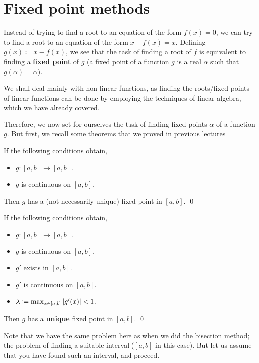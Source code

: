 
\section{Fixed point methods}

Instead of trying to find a root to an equation of the form $f(x) = 0$, we can try to find a root to an equation of the form $x - f(x) = x$. Defining $g(x) \coloneqq x - f(x)$, we see that the task of finding a root of $f$ is equivalent to finding a \textbf{fixed point} of $g$ (a fixed point of a function $g$ is a real $\alpha$ such that $g(\alpha) = \alpha$).

We shall deal mainly with non-linear functions, as finding the roots/fixed points of linear functions can be done by employing the techniques of linear algebra, which we have already covered.

Therefore, we now set for ourselves the task of finding fixed points $\alpha$ of a function $g$. But first, we recall some theorems that we proved in previous lectures

\begin{thm}
	\label{mar4:thm:efp}
	\hfill

	If the following conditions obtain,
	\begin{itemize}
		\item
		      $g \colon [a, b] \to [a, b]$.

		\item
		      $g$ is continuous on $[a, b]$.

	\end{itemize}
	Then $g$ has a (not necessarily unique) fixed point in $[a, b]$.
	\hfill\qed
\end{thm}

\begin{thm}
	\label{mar4:thm:ufp}
	\hfill

	If the following conditions obtain,
	\begin{itemize}
		\item
		      $g \colon [a, b] \to [a, b]$.

		\item
		      $g$ is continuous on $[a, b]$.

		\item
		      $g'$ exists in $[a, b]$.

		\item
		      $g'$ is continuous on $[a, b]$.

		\item
		      $\lambda \coloneqq \max_{x \in [a, b]} \abs{g'(x)} < 1$.

	\end{itemize}
	Then $g$ has a \textbf{unique} fixed point in $[a, b]$.
	\hfill\qed
\end{thm}
Note that we have the same problem here as when we did the bisection method; the problem of finding a suitable interval ($[a, b]$ in this case). But let us assume that you have found such an interval, and proceed.

